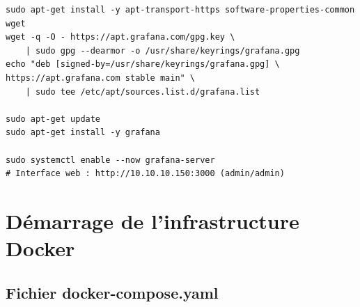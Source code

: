 \documentclass[12pt,a4paper,french]{article}
\begin{document}
\begin{lstlisting}[style=bash, caption={Installer Grafana}]
sudo apt-get install -y apt-transport-https software-properties-common wget
wget -q -O - https://apt.grafana.com/gpg.key \
    | sudo gpg --dearmor -o /usr/share/keyrings/grafana.gpg
echo "deb [signed-by=/usr/share/keyrings/grafana.gpg] \
https://apt.grafana.com stable main" \
    | sudo tee /etc/apt/sources.list.d/grafana.list

sudo apt-get update
sudo apt-get install -y grafana

sudo systemctl enable --now grafana-server
# Interface web : http://10.10.10.150:3000 (admin/admin)
\end{lstlisting}

\section{Démarrage de l'infrastructure Docker}

\subsection{Fichier docker-compose.yaml}
\end{document}
